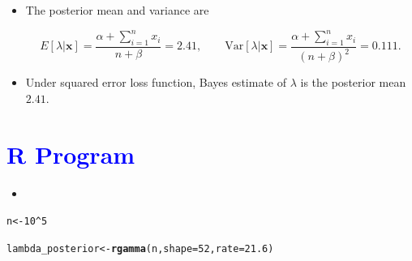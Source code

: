 \documentclass[11pt, a4paper]{article}\usepackage[]{graphicx}\usepackage[]{xcolor}
\makeatletter
\newcommand{\hlnum}[1]{\textcolor[rgb]{0.686,0.059,0.569}{#1}}%
\newcommand{\hlopt}[1]{\textcolor[rgb]{0,0,0}{#1}}%
\newcommand{\hldef}[1]{\textcolor[rgb]{0.345,0.345,0.345}{#1}}%
\newcommand{\hlkwb}[1]{\textcolor[rgb]{0.69,0.353,0.396}{#1}}%
\newcommand{\hlkwc}[1]{\textcolor[rgb]{0.333,0.667,0.333}{#1}}%
\newcommand{\hlkwd}[1]{\textcolor[rgb]{0.737,0.353,0.396}{\textbf{#1}}}%
\newenvironment{kframe}{%
 \def\at@end@of@kframe{}%
 \ifinner\ifhmode%
  \def\at@end@of@kframe{\end{minipage}}%
  \begin{minipage}{\columnwidth}%
 \fi\fi%
 \def\FrameCommand##1{\hskip\@totalleftmargin \hskip-\fboxsep
 \colorbox{shadecolor}{##1}\hskip-\fboxsep
     \hskip-\linewidth \hskip-\@totalleftmargin \hskip\columnwidth}%
 \MakeFramed {\advance\hsize-\width
   \@totalleftmargin\z@ \linewidth\hsize
   \@setminipage}}%
 {\par\unskip\endMakeFramed%
 \at@end@of@kframe}
\newenvironment{knitrout}{}{} %
\makeatother
\begin{document}
\begin{itemize}
From the given, $\lambda | \mathbf{x} \sim \text{Gamma}(52, 21.6)$.

\item[\scalebox{2.0}{\twemoji{keycap: 3}}] \hspace{0.1cm} The posterior mean and variance are

$$E[\lambda | \mathbf{x}] = \dfrac{\alpha + \sum \limits_{i = 1}^{n} x_i}{n + \beta} = 2.41, \qquad \text{Var}[\lambda | \mathbf{x}] = \dfrac{\alpha + \sum \limits_{i = 1}^{n} x_i}{(n + \beta)^2} = 0.111.$$

\item[\scalebox{2.0}{\twemoji{keycap: 4}}] \hspace{0.1cm} Under squared error loss function, Bayes estimate of $\lambda$ is the posterior mean $2.41$.

\end{itemize}

\section*{\faArrowAltCircleRight[regular] \textcolor{blue}{R Program}}





\begin{itemize}
\item[\scalebox{2.0}{\twemoji{keycap: 5}}]
\end{itemize}

\begin{knitrout}
\color{fgcolor}\begin{kframe}
\begin{alltt}
\hldef{n} \hlkwb{<-} \hlnum{10}\hlopt{^}\hlnum{5}
\end{alltt}
\end{kframe}
\end{knitrout}

\begin{knitrout}
\color{fgcolor}\begin{kframe}
\begin{alltt}
\hldef{lambda_posterior} \hlkwb{<-} \hlkwd{rgamma}\hldef{(n,} \hlkwc{shape} \hldef{=} \hlnum{52}\hldef{,} \hlkwc{rate} \hldef{=} \hlnum{21.6}\hldef{)}
\end{alltt}
\end{kframe}
\end{knitrout}
\end{document}
